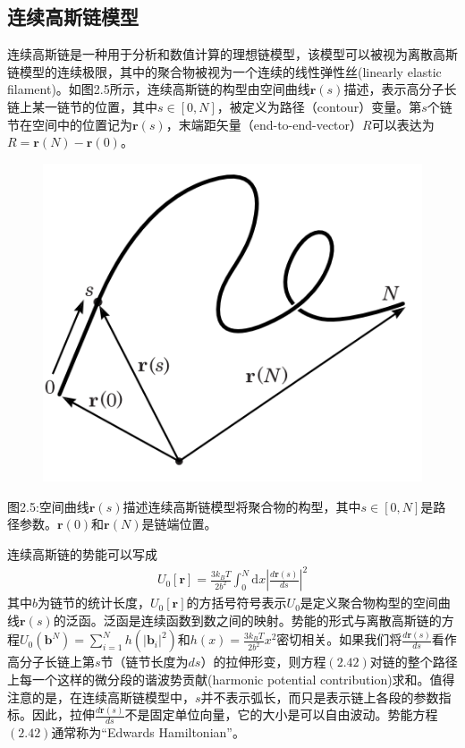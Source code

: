 \subsection{连续高斯链模型}
连续高斯链是一种用于分析和数值计算的理想链模型，该模型可以被视为离散高斯链模型的连续极限，其中的聚合物被视为一个连续的线性弹性丝(linearly elastic filament)。如图2.5所示，连续高斯链的构型由空间曲线$\mathbf{r}(s)$描述，表示高分子长链上某一链节的位置，其中$s\in [0,N]$，被定义为路径（contour）变量。第$s$个链节在空间中的位置记为$\mathbf{r}(s)$，末端距矢量（end-to-end-vector）$R$可以表达为$R=\mathbf{r}(N)−\mathbf{r}(0)$。
\begin{figure}[H]
\centering
\includegraphics[scale=0.7]{./figures/41.png}
\caption{}
\end{figure}
图2.5:空间曲线$\mathbf{r}(s)$描述连续高斯链模型将聚合物的构型，其中$s\in [0,N]$是路径参数。$\mathbf{r}(0)$和$\mathbf{r}(N)$是链端位置。

连续高斯链的势能可以写成
\begin{gather}
U_0[\mathbf{r}]=\frac{3k_BT}{2b^2}\int_{0}^{N} \mathrm{d}x\left| \frac{d\mathbf{r}(s)}{ds} \right|^2
\end{gather}
其中$b$为链节的统计长度，$U_0[\mathbf{r}]$的方括号符号表示$U_0$是定义聚合物构型的空间曲线$\mathbf{r}(s)$的泛函。泛函是连续函数到数之间的映射。势能的形式与离散高斯链的方程$U_0(\mathbf b^N)=\sum_{i=1}^{N}h(\left|\mathbf{b}_i\right|^2 )$和$h(x)=\frac{3k_BT}{2b^2}x^2$密切相关。如果我们将$\frac{d\mathbf{r}(s)}{ds}$看作高分子长链上第$s$节（链节长度为$ds$）的拉伸形变，则方程$(2.42)$对链的整个路径上每一个这样的微分段的谐波势贡献(harmonic potential contribution)求和。值得注意的是，在连续高斯链模型中，$s$并不表示弧长，而只是表示链上各段的参数指标。因此，拉伸$\frac{d\mathbf{r}(s)}{ds}$不是固定单位向量，它的大小是可以自由波动。势能方程$(2.42)$通常称为“Edwards Hamiltonian”。

